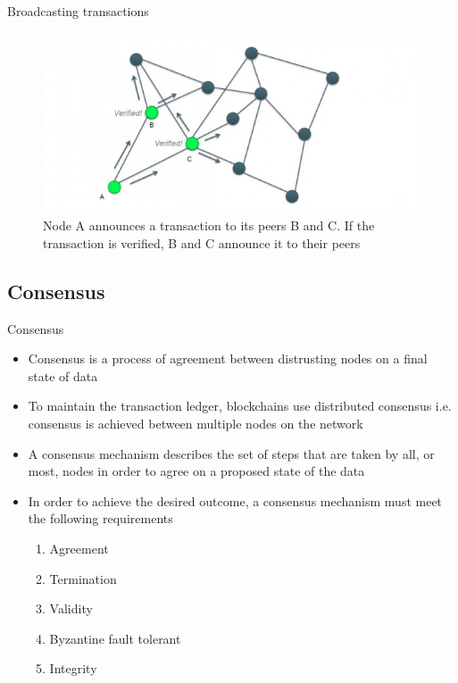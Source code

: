 \documentclass[9pt]{beamer}
\begin{document}
\begin{frame}{Broadcasting transactions}
	\begin{figure}[]
		\centering
		\includegraphics  [scale=0.4]{Images/broadcast}
		\caption{Node A announces a transaction to its peers B and C. If the transaction is verified, B and C announce it to their peers}
	\end{figure}
\end{frame}



\subsection{Consensus}

\begin{frame}{Consensus}
	\begin{itemize}
		\item Consensus is a process of agreement between distrusting nodes on a final state of data
		\item To maintain the transaction ledger, blockchains use distributed consensus i.e. consensus is achieved between multiple nodes on the network
		\item A consensus mechanism describes the set of steps that are taken by all, or most, nodes in order to agree on a proposed state of the data
		\item In order to achieve the desired outcome, a consensus mechanism must meet the following requirements
		\begin{enumerate}
			\item Agreement
			\item Termination
			\item Validity
			\item Byzantine fault tolerant
			\item Integrity
		\end{enumerate}
	\end{itemize}
\end{frame}
\end{document}
